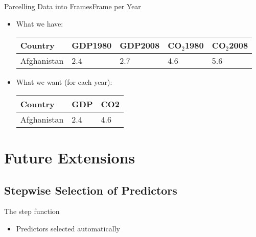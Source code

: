 \documentclass{beamer}
\begin{document}
\begin{frame}{Parcelling Data into Frames}{Frame per Year}
\begin{itemize}
  \item What we have: \\
    \begin{table}
      \begin{tabular}{| l || l | l | l | l |} \hline
        Country& GDP1980& GDP2008& CO$_2$1980& CO$_2$2008 \\ \hline
        Afghanistan& 2.4& 2.7& 4.6& 5.6 \\ \hline
        \end{tabular}
      \end{table}
    
    \item What we want (for each year): \\
      \begin{table}
        \begin{tabular}{ | l || l | l | } \hline
          Country     & GDP & CO2 \\ \hline
          Afghanistan & 2.4 & 4.6 \\ \hline
          \end{tabular}
        \end{table}
\end{itemize}
\end{frame}


\section{Future Extensions}

\subsection{Stepwise Selection of Predictors}

\begin{frame}{The step function}
\begin{itemize}
\item Predictors selected automatically
\end{itemize}
\end{frame}
\end{document}
